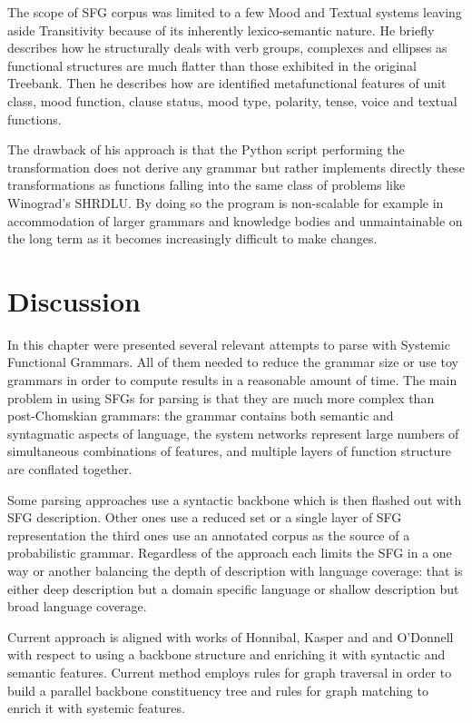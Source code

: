 The scope of SFG corpus was limited to a few Mood and Textual systems leaving aside Transitivity because of its inherently lexico-semantic nature. He briefly describes how he structurally deals with verb groups, complexes and ellipses as functional structures are much flatter than those exhibited in the original Treebank. Then he describes how are identified metafunctional features of unit class, mood function, clause status, mood type, polarity, tense, voice and textual functions.

The drawback of his approach is that the Python script performing the transformation does not derive any grammar but rather implements directly these transformations as functions falling into the same class of problems like Winograd's SHRDLU. By doing so the program is non-scalable for example in accommodation of larger grammars and knowledge bodies and unmaintainable on the long term as it becomes increasingly difficult to make changes. 

\section{Discussion}
In this chapter were presented several relevant attempts to parse with Systemic Functional Grammars. All of them needed to reduce the grammar size or use toy grammars in order to compute results in a reasonable amount of time. The main problem in using SFGs for parsing is that they are much more complex than post-Chomskian grammars: the grammar contains both semantic and syntagmatic aspects of language, the system networks represent large numbers of simultaneous combinations of features, and multiple layers of function structure are conflated together. 

Some parsing approaches use a syntactic backbone which is then flashed out with SFG description. Other ones use a reduced set or a single layer of SFG representation the third ones use an annotated corpus as the source of a probabilistic grammar. Regardless of the approach each limits the SFG in a one way or another balancing the depth of description with language coverage: that is either deep description but a domain specific language or shallow description but broad language coverage. 

Current approach is aligned with works of Honnibal, Kasper and and O'Donnell with respect to using a backbone structure and enriching it with syntactic and semantic features. Current method employs rules for graph traversal in order to build a parallel backbone constituency tree and rules for graph matching to enrich it with systemic features. 

